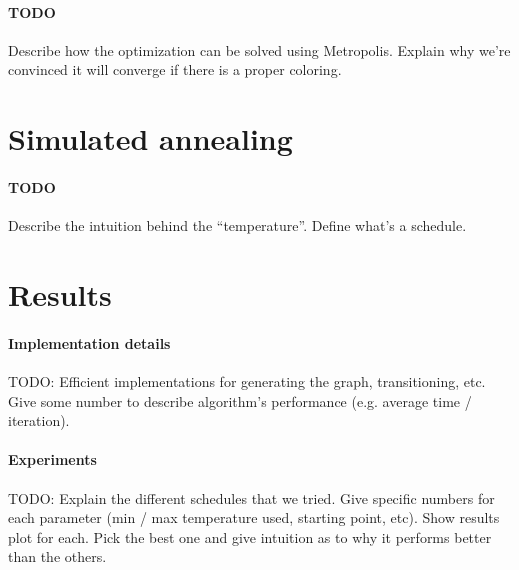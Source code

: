 \documentclass{report}
\begin{document}
  \paragraph{TODO} Describe how the optimization can be solved using Metropolis. Explain why we're convinced it will converge if there is a proper coloring.

  \section*{Simulated annealing}
  \paragraph{TODO} Describe the intuition behind the ``temperature''. Define what's a schedule.

  \section*{Results}
  \paragraph{Implementation details}
  TODO: Efficient implementations for generating the graph, transitioning, etc. Give some number to describe algorithm's performance (e.g. average time / iteration).

  \paragraph{Experiments}
  TODO: Explain the different schedules that we tried. Give specific numbers for each parameter (min / max temperature used, starting point, etc). Show results plot for each. Pick the best one and give intuition as to why it performs better than the others.
\end{document}
